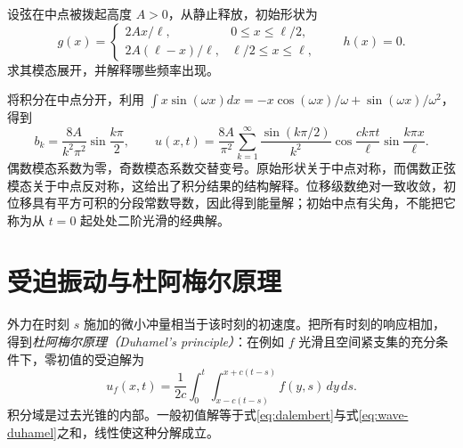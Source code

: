 \begin{example}[在中点拨起后释放]
设弦在中点被拨起高度 $A>0$，从静止释放，初始形状为
\[
 g(x)=\begin{cases}2Ax/\ell,&0\le x\le\ell/2,\\
 2A(\ell-x)/\ell,&\ell/2\le x\le\ell,
 \end{cases}\qquad h(x)=0.
\]
求其模态展开，并解释哪些频率出现。
\end{example}
\begin{solve}
将积分在中点分开，利用 $\int x\sin(\omega x)dx=-x\cos(\omega x)/\omega+\sin(\omega x)/\omega^2$，得到
\[
 b_k=\frac{8A}{k^2\pi^2}\sin\frac{k\pi}{2},\qquad
 u(x,t)=\frac{8A}{\pi^2}\sum_{k=1}^\infty
 \frac{\sin(k\pi/2)}{k^2}\cos\frac{ck\pi t}{\ell}\sin\frac{k\pi x}{\ell}.
\]
偶数模态系数为零，奇数模态系数交替变号。原始形状关于中点对称，而偶数正弦模态关于中点反对称，这给出了积分结果的结构解释。位移级数绝对一致收敛，初位移具有平方可积的分段常数导数，因此得到能量解；初始中点有尖角，不能把它称为从 $t=0$ 起处处二阶光滑的经典解。
\end{solve}

\section{受迫振动与杜阿梅尔原理}
外力在时刻 $s$ 施加的微小冲量相当于该时刻的初速度。把所有时刻的响应相加，得到\emph{杜阿梅尔原理（Duhamel's principle）}：在例如 $f$ 光滑且空间紧支集的充分条件下，零初值的受迫解为
\begin{equation}
 u_f(x,t)=\frac1{2c}\int_0^t\int_{x-c(t-s)}^{x+c(t-s)}f(y,s)\,dy\,ds.
 \label{eq:wave-duhamel}
\end{equation}
积分域是过去光锥的内部。一般初值解等于式\eqref{eq:dalembert}与式\eqref{eq:wave-duhamel}之和，线性使这种分解成立。

